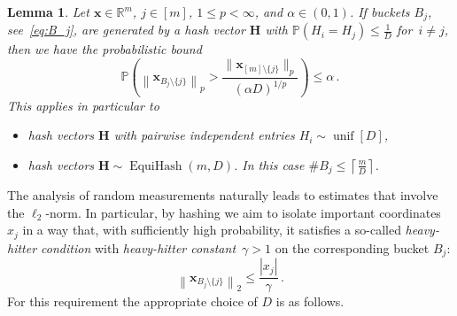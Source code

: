 \documentclass[12pt]{article}
\theoremstyle{plain}
\newtheorem{lemma}[theorem]{Lemma}
\theoremstyle{definition}
\renewcommand{\P}{{\mathbb P}}
\DeclareMathOperator{\Uniform}{unif}
\DeclareMathOperator{\EquiHash}{EquiHash}
\renewcommand{\vec}{\boldsymbol}
\newcommand{\R}{{\mathbb R}}
\begin{document}
\begin{lemma} \label{lem:hash}
    Let $\vec{x} \in \R^m$, $j \in [m]$, $1 \leq p < \infty$, and 
    $\alpha \in (0,1)$.
    If buckets $B_j$, see~\eqref{eq:B_j},
    are generated by a hash vector $\vec{H}$ with $\P(H_i = H_j) \leq \frac{1}{D}$
    for~\mbox{$i\neq j$}, then we have the probabilistic bound
    \begin{equation*}
        \P\left(\left\|\vec{x}_{B_j \setminus \{j\}}\right\|_{p}
                > \frac{\| \vec{x}_{[m] \setminus \{j\}  } \|_p}{(\alpha D)^{1/p}}\right)
            \leq \alpha \,.
            \label{eq:p-norm-hash}
    \end{equation*}
    This applies in particular to
    \begin{itemize}
        \item hash vectors $\vec{H}$ with pairwise independent entries $H_i \sim \Uniform[D]$,
        \item hash vectors $\vec{H} \sim \EquiHash(m,D)$.
            In this case $\#B_j \leq \left\lceil\frac{m}{D}\right\rceil$.
    \end{itemize}
\end{lemma}

The analysis of random measurements naturally leads to estimates that involve the $\ell_2$-norm.
In particular, by hashing we aim to isolate important coordinates $x_j$ in a way that,
with sufficiently high probability,
it satisfies a so-called \emph{heavy-hitter condition} with \emph{heavy-hitter constant}~$\gamma > 1$ on the corresponding bucket $B_j$:
\begin{equation} \label{eq:heavyhitter-abstract}
    \left\|\vec{x}_{B_j\setminus\{j\}}\right\|_2 \leq \frac{|x_j|}{\gamma} \,.
\end{equation}
For this requirement the appropriate choice of $D$ is as follows.
\end{document}
